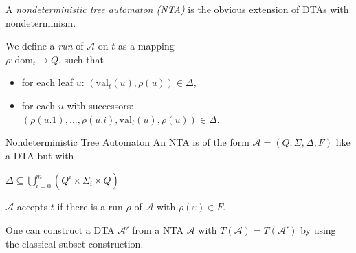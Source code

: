 \documentclass[english]{panikzettel}
\newcommand{\A}{\mathcal{A}}
\newcommand{\dom}{\mathrm{dom}}
\newcommand{\val}{\mathrm{val}}
\begin{document}
\begin{halfboxl}
    A \emph{nondeterministic tree automaton (NTA)} is the obvious extension of DTAs with nondeterminism.

    We define a \emph{run} of $\A$ on $t$ as a mapping \\
    $\rho : \dom_t \to Q$, such that
    \begin{itemize}
        \item for each leaf $u$: $(\val_t(u),\rho(u)) \in \Delta$,
        \item for each $u$ with successors: \\
                $(\rho(u.1),\ldots,\rho(u.i),\val_t(u),\rho(u)) \in \Delta$.
    \end{itemize}
\end{halfboxl}%
\begin{halfboxr}
    \vspace{-\baselineskip}
    \begin{defi}{Nondeterministic Tree Automaton}
        An NTA is of the form $\A = (Q,\Sigma,\Delta,F)$ like a DTA but with
        \begin{tightcenter}
        $\Delta \subseteq \bigcup_{i=0}^m (Q^i \times \Sigma_i \times Q)$
        \end{tightcenter}
    \end{defi}
    \vspace{.1\baselineskip}

    $\A$ accepts $t$ if there is a run $\rho$ of $\A$ with $\rho(\varepsilon) \in F$.
\end{halfboxr}

One can construct a DTA $\mathcal{A'}$ from a NTA $\mathcal{A}$ with $T(\A)=T(\A')$ by using the classical subset construction.
\end{document}
